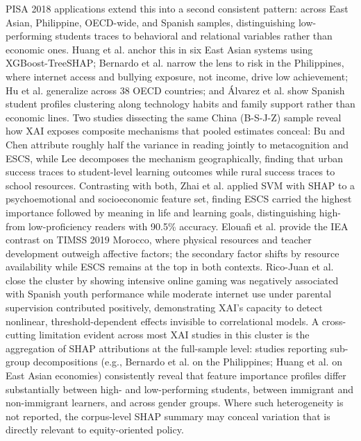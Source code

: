 \documentclass{ieeeaccess}
\begin{document}
PISA 2018 applications extend this into a second consistent pattern: across East Asian, Philippine, OECD-wide, and Spanish samples, distinguishing low-performing students traces to behavioral and relational variables rather than economic ones. Huang et al. \cite{huang-etal2024} anchor this in six East Asian systems using XGBoost-TreeSHAP; Bernardo et al. \cite{bernardo-etal2021, bernardo-etal2023} narrow the lens to risk in the Philippines, where internet access and bullying exposure, not income, drive low achievement; Hu et al. \cite{hu-etal2023} generalize across 38 OECD countries; and \'{A}lvarez et al. \cite{alvarez-etal2024} show Spanish student profiles clustering along technology habits and family support rather than economic lines. Two studies dissecting the same China (B-S-J-Z) sample reveal how XAI exposes composite mechanisms that pooled estimates conceal: Bu and Chen \cite{bu-chen2023} attribute roughly half the variance in reading jointly to metacognition and ESCS, while Lee \cite{lee-WhatDrivesPerformance2022} decomposes the mechanism geographically, finding that urban success traces to student-level learning outcomes while rural success traces to school resources. Contrasting with both, Zhai et al. \cite{zhai-etal2024} applied SVM with SHAP to a psychoemotional and socioeconomic feature set, finding ESCS carried the highest importance followed by meaning in life and learning goals, distinguishing high- from low-proficiency readers with 90.5\% accuracy. Elouafi et al. \cite{elouafi-etal2025} provide the IEA contrast on TIMSS 2019 Morocco, where physical resources and teacher development outweigh affective factors; the secondary factor shifts by resource availability while ESCS remains at the top in both contexts. Rico-Juan et al. \cite{rico-juan-etal2024} close the cluster by showing intensive online gaming was negatively associated with Spanish youth performance while moderate internet use under parental supervision contributed positively, demonstrating XAI's capacity to detect nonlinear, threshold-dependent effects invisible to correlational models. A cross-cutting limitation evident across most XAI studies in this cluster is the aggregation of SHAP attributions at the full-sample level: studies reporting sub-group decompositions (e.g., Bernardo et al. \cite{bernardo-etal2021, bernardo-etal2023} on the Philippines; Huang et al. \cite{huang-etal2024} on East Asian economies) consistently reveal that feature importance profiles differ substantially between high- and low-performing students, between immigrant and non-immigrant learners, and across gender groups. Where such heterogeneity is not reported, the corpus-level SHAP summary may conceal variation that is directly relevant to equity-oriented policy.
\end{document}
